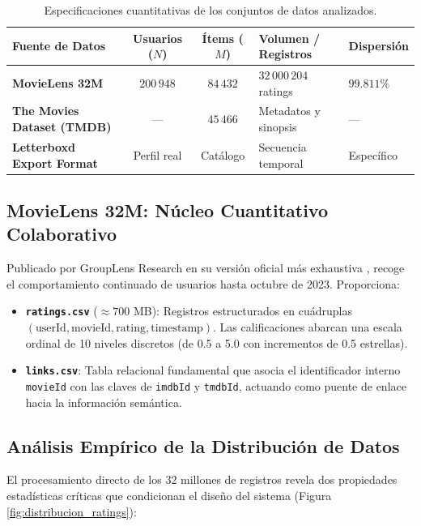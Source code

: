 \documentclass[a4paper,11pt]{article}
\begin{document}
\begin{table}[!htbp]
    \centering
    \small
    \setlength{\tabcolsep}{5pt}
    \caption{Especificaciones cuantitativas de los conjuntos de datos analizados.}
    \label{tab:resumen_datasets}
    \begin{tabularx}{\textwidth}{p{4.3cm} c c X >{\centering\arraybackslash}p{2.5cm}}
        \toprule
        \textbf{Fuente de Datos} & \textbf{Usuarios ($N$)} & \textbf{Ítems ($M$)} & \textbf{Volumen / Registros} & \textbf{Dispersión} \\ 
        \midrule
        \textbf{MovieLens 32M} & $200\,948$ & $84\,432$ & $32\,000\,204$ ratings & $99.811\%$ \\
        \textbf{The Movies Dataset (TMDB)} & --- & $45\,466$ & Metadatos y sinopsis & --- \\
        \textbf{Letterboxd Export Format} & Perfil real & Catálogo & Secuencia temporal & Específico \\ 
        \bottomrule
    \end{tabularx}
\end{table}

\subsection{MovieLens 32M: Núcleo Cuantitativo Colaborativo}
Publicado por GroupLens Research en su versión oficial más exhaustiva \cite{movielens}, recoge el comportamiento continuado de usuarios hasta octubre de 2023. Proporciona:
\begin{itemize}
    \item \textbf{\texttt{ratings.csv}} ($\approx 700$ MB): Registros estructurados en cuádruplas $(\text{userId}, \text{movieId}, \text{rating}, \text{timestamp})$. Las calificaciones abarcan una escala ordinal de 10 niveles discretos (de 0.5 a 5.0 con incrementos de 0.5 estrellas).
    \item \textbf{\texttt{links.csv}}: Tabla relacional fundamental que asocia el identificador interno \texttt{movieId} con las claves de \texttt{imdbId} y \texttt{tmdbId}, actuando como puente de enlace hacia la información semántica.
\end{itemize}

\subsection{Análisis Empírico de la Distribución de Datos}
El procesamiento directo de los 32 millones de registros revela dos propiedades estadísticas críticas que condicionan el diseño del sistema (Figura \ref{fig:distribucion_ratings}):
\end{document}
